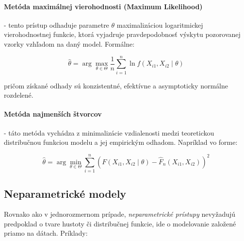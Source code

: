 \paragraph{Metóda maximálnej vierohodnosti (Maximum Likelihood)} - tento prístup odhaduje parametre $\theta$ maximalizáciou logaritmickej vierohodnostnej funkcie, ktorá vyjadruje pravdepodobnosť výskytu pozorovanej vzorky vzhľadom na daný model. Formálne:

\begin{equation}
\hat{\theta} = \arg\max_{\theta \in \Theta} \frac{1}{n} \sum_{i=1}^{n} \ln f(X_{i1}, X_{i2} \mid \theta)
\end{equation}

pričom získané odhady sú konzistentné, efektívne a asymptoticky normálne rozdelené.

\paragraph{Metóda najmenších štvorcov} - táto metóda vychádza z minimalizácie vzdialenosti medzi teoretickou distribučnou funkciou modelu a jej empirickým odhadom. Napríklad vo forme:

\begin{equation}
\hat{\theta} = \arg\min_{\theta \in \Theta} \sum_{i=1}^{n} \left( F(X_{i1}, X_{i2} \mid \theta) - \hat{F}_n(X_{i1}, X_{i2}) \right)^2
\end{equation}

\subsection{Neparametrické modely}\label{subsec:joint_nonparam_models}

Rovnako ako v jednorozmernom prípade, \textit{neparametrické prístupy} nevyžadujú predpoklad o tvare hustoty či distribučnej funkcie, ide o modelovanie založené priamo na dátach. Príklady:

